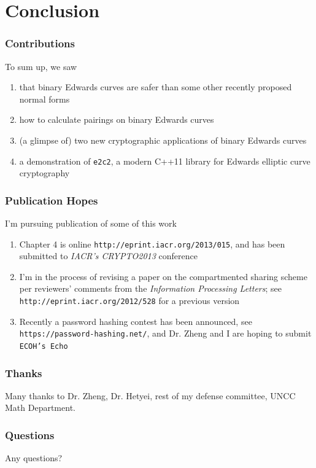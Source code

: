 \documentclass[xcolor=dvipsnames, handout]{beamer}
\begin{document}
\section{Conclusion}

\begin{frame}
    \frametitle{Contributions}
    To sum up, we saw
    \begin{enumerate}
        \item that binary Edwards curves are safer than some other
            recently proposed normal forms
        \item how to calculate pairings on binary Edwards curves
        \item (a glimpse of) two new cryptographic applications of binary
        Edwards curves
        \item a demonstration of \texttt{e2c2}, a modern C++11 library for
            Edwards elliptic curve cryptography
    \end{enumerate}
\end{frame}

\begin{frame}
    \frametitle{Publication Hopes}
    I'm pursuing publication of some of this work
    \begin{enumerate}
    \item Chapter 4 is online \texttt{http://eprint.iacr.org/2013/015}, and has
        been submitted to \textit{IACR's CRYPTO2013} conference
    \item I'm in the process of revising a paper on the compartmented sharing
    scheme per reviewers' comments from the \textit{Information Processing
    Letters}; see \texttt{http://eprint.iacr.org/2012/528} for a previous
    version
    \item Recently a password hashing contest has been announced, see
    \texttt{https://password-hashing.net/}, and Dr. Zheng and I are hoping to
    submit \texttt{ECOH's Echo}
    \end{enumerate}
\end{frame}

\begin{frame}
    \frametitle{Thanks}
    Many thanks to Dr. Zheng, Dr. Hetyei, rest of my defense committee, UNCC
        Math Department.
\end{frame}

\begin{frame}
    \frametitle{Questions}
    Any questions?
\end{frame}
\end{document}
